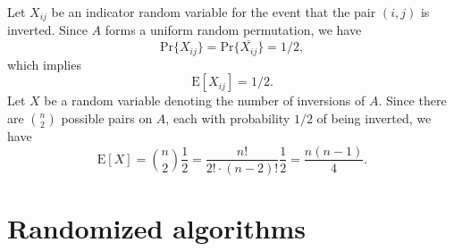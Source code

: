 \begin{enumerate}
\begin{framed}
Let $X_{ij}$ be an indicator random variable for the event that the pair
$(i, j)$ is inverted. Since $A$ forms a uniform random permutation, we have
\[
\text{Pr}\{X_{ij}\} = \text{Pr}\{\overline{X_{ij}}\} = 1/2,
\]
which implies
\[
  \text{E}[X_{ij}] = 1/2.
\]
Let $X$ be a random variable denoting the number of
inversions of $A$. Since there are $\binom{n}{2}$ possible pairs on $A$, each
with probability $1/2$ of being inverted, we have
\[
  \text{E}[X] = \binom{n}{2} \frac{1}{2} = \frac{n!}{2! \cdot (n - 2)!} \frac{1}{2} = \frac{n (n - 1)}{4}.
\]
\end{framed}

\end{enumerate}

\newpage

\section{Randomized algorithms}

